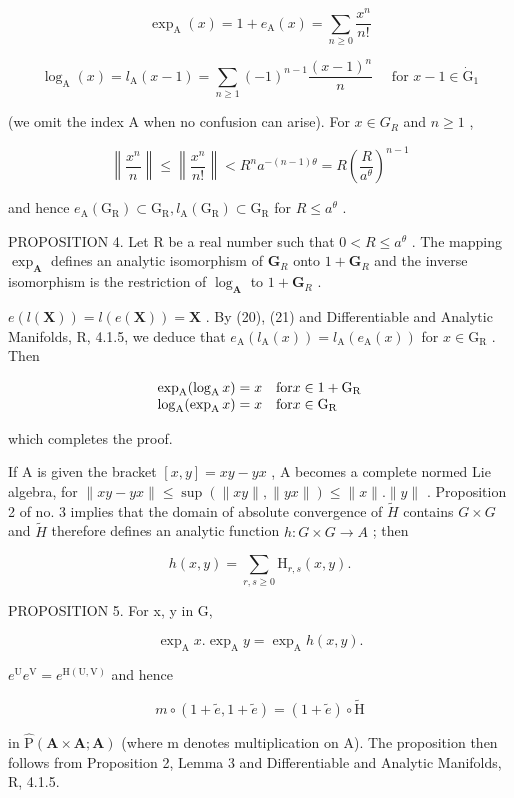 \[
\exp_ {\mathrm{A}} (x) = 1 + e _ {\mathrm{A}} (x) = \sum_ {n \geqslant 0} \frac {x ^ {n}}{n !}\tag{22}
\]

\[
\log_ {\mathrm{A}} (x) = l _ {\mathrm{A}} (x - 1) = \sum_ {n \geqslant 1} (- 1) ^ {n - 1} \frac {(x - 1) ^ {n}}{n} \quad \text { for } x - 1 \in \dot {\mathrm{G}} _ {1}\tag{23}
\]

(we omit the index A when no confusion can arise). For \(x \in G_R\) and \(n \geqslant 1\) ,

\[
\left\| \frac {x ^ {n}}{n} \right\| \leqslant \left\| \frac {x ^ {n}}{n !} \right\| <   R ^ {n} a ^ {- (n - 1) \theta} = R \left(\frac {R}{a ^ {\theta}}\right) ^ {n - 1}\tag{24}
\]

and hence \(e_{\mathrm{A}}(\mathrm{G}_{\mathrm{R}}) \subset \mathrm{G}_{\mathrm{R}}, l_{\mathrm{A}}(\mathrm{G}_{\mathrm{R}}) \subset \mathrm{G}_{\mathrm{R}}\) for \(R \leqslant a^{\theta}\) .

PROPOSITION 4. Let R be a real number such that \(0 < R \leqslant a^{\theta}\) . The mapping \(\exp_{\mathbf{A}}\) defines an analytic isomorphism of \(\mathbf{G}_{R}\) onto \(1 + \mathbf{G}_{R}\) and the inverse isomorphism is the restriction of \(\log_{\mathbf{A}}\) to \(1 + \mathbf{G}_{R}\) .

\(e(l(\mathbf{X})) = l(e(\mathbf{X})) = \mathbf{X}\) . By (20), (21) and Differentiable and Analytic Manifolds, R, 4.1.5, we deduce that \(e_{\mathrm{A}}(l_{\mathrm{A}}(x)) = l_{\mathrm{A}}(e_{\mathrm{A}}(x))\) for \(x \in \mathrm{G}_{\mathrm{R}}\) . Then

\[
\begin{array}{l l} \exp_ {\mathrm{A}} (\log_ {\mathrm{A}} x) = x & \text {for} x \in 1 + \mathrm{G} _ {\mathrm{R}} \\ \log_ {\mathrm{A}} (\exp_ {\mathrm{A}} x) = x & \text {for} x \in \mathrm{G} _ {\mathrm{R}} \end{array}
\]

which completes the proof.

If A is given the bracket \([x,y]=xy-yx\) , A becomes a complete normed Lie algebra, for \(\|xy-yx\|\leqslant\sup(\|xy\|,\|yx\|)\leqslant\|x\|. \|y\|\) . Proposition 2 of no. 3 implies that the domain of absolute convergence of \(\tilde{H}\) contains \(G\times G\) and \(\tilde{H}\) therefore defines an analytic function \(h:G\times G\to A\) ; then

\[
h (x, y) = \sum_ {r, s \geqslant 0} \mathrm{H} _ {r, s} (x, y).\tag{25}
\]

PROPOSITION 5. For x, y in G,

\[
\exp_ {\mathrm{A}} x. \exp_ {\mathrm{A}} y = \exp_ {\mathrm{A}} h (x, y).\tag{26}
\]

\(e^{\mathrm{U}}e^{\mathrm{V}} = e^{\mathrm{H(U,V)}}\) and hence

\[
m \circ (1 + \tilde {e}, 1 + \tilde {e}) = (1 + \tilde {e}) \circ \tilde {\mathrm{H}}
\]

in \(\hat{\mathrm{P}}(\mathbf{A} \times \mathbf{A}; \mathbf{A})\) (where m denotes multiplication on A). The proposition then follows from Proposition 2, Lemma 3 and Differentiable and Analytic Manifolds, R, 4.1.5.


